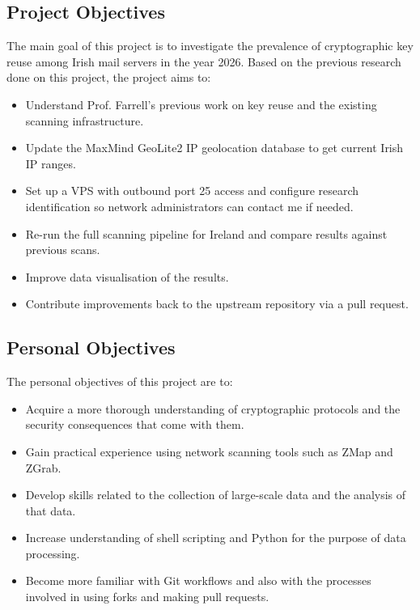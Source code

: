 \subsection{Project Objectives}

The main goal of this project is to investigate the prevalence of cryptographic key reuse among Irish mail servers in the year 2026. Based on the previous research done on this project, the project aims to:

\begin{itemize}
    \item Understand Prof. Farrell's previous work \cite{cryptoeprint:2018/299} on key reuse and the existing scanning infrastructure.
    \item Update the MaxMind GeoLite2 IP geolocation database to get current Irish IP ranges.
    \item Set up a VPS with outbound port 25 access and configure research identification so network administrators can contact me if needed.
    \item Re-run the full scanning pipeline for Ireland and compare results against previous scans.
    \item Improve data visualisation of the results.
    \item Contribute improvements back to the upstream repository via a pull request.
\end{itemize}

\subsection{Personal Objectives}

The personal objectives of this project are to:

\begin{itemize}
    \item Acquire a more thorough understanding of cryptographic protocols and the security consequences that come with them.
    \item Gain practical experience using network scanning tools such as ZMap and ZGrab.
    \item Develop skills related to the collection of large-scale data and the analysis of that data.
    \item Increase understanding of shell scripting and Python for the purpose of data processing.
    \item Become more familiar with Git workflows and also with the processes involved in using forks and making pull requests.
\end{itemize}

